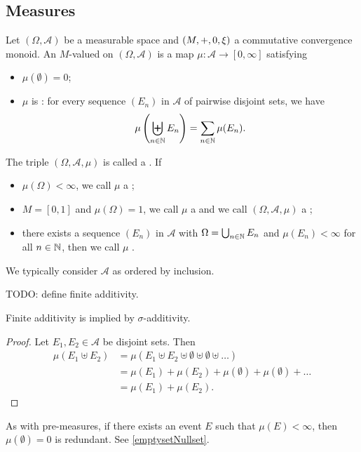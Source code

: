 \subsection{Measures}
\begin{definition}
Let $(\Omega,\mathcal{A})$ be a measurable space and $\left( M,+,0,\xi \right)$ a commutative convergence monoid. An $M$-valued  on $(\Omega,\mathcal{A})$ is a map $\mu: \mathcal{A} \to [0,\infty]$ satisfying
\begin{itemize}
\item $\mu(\emptyset) = 0$;
\item $\mu$ is : for every sequence $(E_n)$ in $\mathcal{A}$ of pairwise disjoint sets, we have
\[ \mu\left(\biguplus_{n\in\mathbb{N}}E_n\right) = \sum_{n\in\mathbb{N}}\mu(E_n). \]
\end{itemize}
The triple $(\Omega, \mathcal{A}, \mu)$ is called a . If
\begin{itemize}
\item $\mu(\Omega) < \infty$, we call $\mu$ a ;
\item $M = [0,1]$ and $\mu(\Omega) = 1$, we call $\mu$ a  and we call $(\Omega, \mathcal{A}, \mu)$ a ;
\item there exists a sequence $(E_n)$ in $\mathcal{A}$ with $\Omega = \bigcup_{n\in\mathbb{N}}E_n$ and $\mu(E_n)<\infty$ for all $n\in\mathbb{N}$, then we call $\mu$ .
\end{itemize}
\end{definition}
We typically consider $\mathcal{A}$ as ordered by inclusion.

TODO: define finite additivity.

\begin{lemma}
Finite additivity is implied by $\sigma$-additivity.
\end{lemma}
\begin{proof}
Let $E_1,E_2\in\mathcal{A}$ be disjoint sets. Then
\begin{align*}
\mu(E_1\uplus E_2) &= \mu(E_1\uplus E_2 \uplus \emptyset \uplus \emptyset \uplus \ldots) \\
&= \mu(E_1) + \mu(E_2) + \mu(\emptyset) + \mu(\emptyset) + \ldots \\
&= \mu(E_1) + \mu(E_2).
\end{align*}
\end{proof}

As with pre-measures, if there exists an event $E$ such that $\mu(E)< \infty$, then $\mu(\emptyset) = 0$ is redundant. See \ref{emptysetNullset}.

